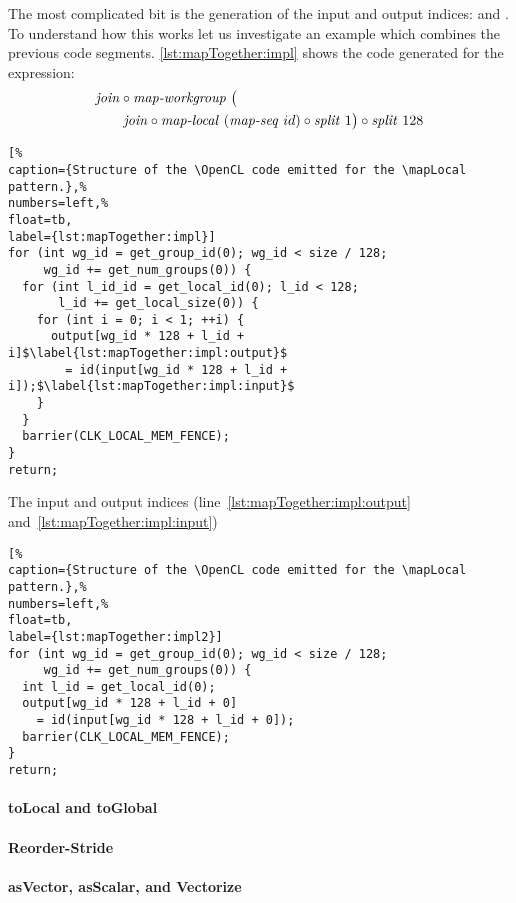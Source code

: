 The most complicated bit is the generation of the input and output indices:  and .
To understand how this works let us investigate an example which combines the previous code segments.
\autoref{lst:mapTogether:impl} shows the code generated for the expression:
\begin{align*}
  &\text{\textit{join}} \circ \text{\textit{map-workgroup}}\ \big(\\
  &\qquad\text{\textit{join}} \circ \text{\textit{map-local}}\ (\text{\textit{map-seq}}\ id) \circ \text{\textit{split}}\ 1\big) \circ \text{\textit{split}}\ 128
\end{align*}
%
\begin{lstlisting}[%                                                             
caption={Structure of the \OpenCL code emitted for the \mapLocal pattern.},%
numbers=left,%
float=tb,
label={lst:mapTogether:impl}]
for (int wg_id = get_group_id(0); wg_id < size / 128;
     wg_id += get_num_groups(0)) {
  for (int l_id_id = get_local_id(0); l_id < 128;
       l_id += get_local_size(0)) {
    for (int i = 0; i < 1; ++i) {
      output[wg_id * 128 + l_id + i]$\label{lst:mapTogether:impl:output}$
        = id(input[wg_id * 128 + l_id + i]);$\label{lst:mapTogether:impl:input}$
    }
  }
  barrier(CLK_LOCAL_MEM_FENCE);
}
return;
\end{lstlisting}
%
The input and output indices (line~\ref{lst:mapTogether:impl:output} and~\ref{lst:mapTogether:impl:input})

\begin{lstlisting}[%                                                             
caption={Structure of the \OpenCL code emitted for the \mapLocal pattern.},%
numbers=left,%
float=tb,
label={lst:mapTogether:impl2}]
for (int wg_id = get_group_id(0); wg_id < size / 128;
     wg_id += get_num_groups(0)) {
  int l_id = get_local_id(0);
  output[wg_id * 128 + l_id + 0]
    = id(input[wg_id * 128 + l_id + 0]);
  barrier(CLK_LOCAL_MEM_FENCE);
}
return;
\end{lstlisting}


\paragraph{{\footnotesize to}Local and {\footnotesize to}Global}

\paragraph{Reorder-Stride}

\paragraph{{\footnotesize as}Vector, {\footnotesize as}Scalar, and Vectorize}



